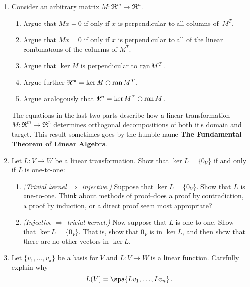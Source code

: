 


\begin{enumerate}

\item 
Consider an arbitrary matrix $M:\Re^m\to \Re^n.$
\begin{enumerate}
\item Argue that $Mx=0$ if only if $x$ is perpendicular to all columns of~$M^T$.
\item Argue that $Mx=0$ if only if $x$ is perpendicular to all of the linear combinations of the columns of $M^T$.
\item Argue that $\ker M$ is perpendicular to ${\rm ran} \,M^T$. 
\item Argue further $\Re^m=\ker M \oplus {\rm ran}\, M^T$. 
\item Argue analogously that $\Re^n=\ker M^T \oplus {\rm ran}\, M$. 
\end{enumerate} 
The equations in the last two parts describe how a linear transformation $M:\Re^m\to \Re^n$ determines orthogonal decompositions of both it's domain and target. This result sometimes goes by the humble name {\bf{The Fundamental Theorem of Linear Algebra}}.




\item \label{injectivekernalprob} Let $L \colon V\rightarrow W$ be a linear transformation.  Show that $\ker L=\{0_V\}$ if and only if $L$ is one-to-one:
\begin{enumerate}
\item {\itshape (Trivial kernel $\Rightarrow$ injective.)} Suppose that \(\ker L=\{0_V\}\). Show that \(L\) is one-to-one. Think about methods of proof--does a proof by contradiction, a proof by induction, or a direct proof seem most appropriate?
\item {\itshape (Injective $\Rightarrow$ trivial kernel.)} Now suppose that \(L\) is one-to-one. Show that \(\ker L=\{0_V\}\). That is, show that \(0_V\) is in \(\ker L\), and then show that there are no other vectors in \(\ker L\).
\end{enumerate}

\item Let $\{v_1, \ldots, v_n  \}$ be a basis for $V$ and $L:V\to W$ is a linear function. Carefully explain why
\[
L(V)=\spa \{Lv_1, \ldots, Lv_n \}\, .
\]



\end{enumerate}
